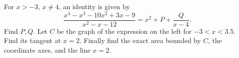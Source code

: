 For $x>-3$, $x\ne4$, an identity is given by
\[
\dfrac{x^4-x^3-10x^2+3x-9}{x^2-x-12}=x^2+P+\dfrac{Q}{x-4}.
\]
Find $P,Q$. Let $C$ be the graph of the expression on the left for $-3<x<3.5$. Find its tangent at $x=2$. Finally find the exact area bounded by $C$, the coordinate axes, and the line $x=2$.
